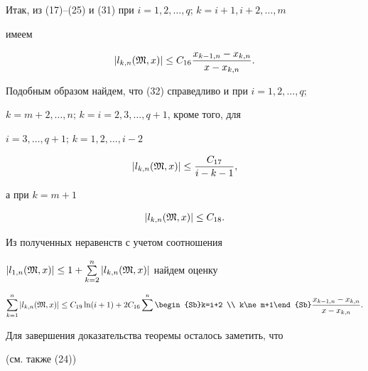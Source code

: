 Итак, из (17)--(25) и (31) при $i=1,2,\dotsc,q$; $k=i+1,i+2,\dotsc,m$


имеем


\begin{equation}


|l_{k,n}(\frak M,x)|\le C_{16}


\frac{x_{k-1,n}-x_{k,n}}{x-x_{k,n}}.


\end{equation}


Подобным образом найдем, что (32) справедливо и при $i=1,2,\dotsc,q$;


$k=m+2,\dotsc,n$; $k=i=2,3,\dotsc,q+1$, кроме того, для


$i=3,\dotsc,q+1$; $k=1,2,\dotsc,i-2$


$$


|l_{k,n}(\frak M,x)|\le\frac{C_{17}}{i-k-1},


$$


а при $k=m+1$


$$


|l_{k,n}(\frak M,x)|\le C_{18}.


$$


Из полученных неравенств с учетом соотношения


$|l_{1,n}(\frak M,x)|\le 1+\sum\limits^n_{k=2}


|l_{k,n}(\frak M,x)|$ найдем оценку


$$


\sum^n_{k=1}|l_{k,n}(\frak M,x)|\le C_{19}\ln(i+1)+


2C_{16}\sum^n\begin{Sb}k=i+2 \\ k\ne m+1\end{Sb}


\frac{x_{k-1,n}-x_{k,n}}{x-x_{k,n}}.


$$


Для завершения доказательства теоремы осталось заметить, что


(см. также (24))


